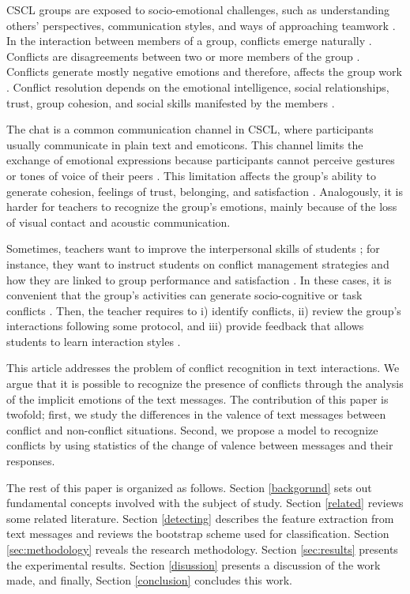 \documentclass[3p,times,preprint]{elsarticle}
\begin{document}
CSCL groups are exposed to socio-emotional challenges, such as understanding others' perspectives, communication styles, and ways of approaching
teamwork \citep{Jarvenoja2013}. In the interaction between members of a group, conflicts emerge naturally  \citep{Naykki2014}. Conflicts are disagreements between two or more members of the group \citep{Ayoko2008}. Conflicts generate mostly negative emotions and therefore, affects the group work \citep{Dreu2003,Jehn1997,Jiang2013,Lee2015}. %
Conflict resolution depends on the emotional intelligence, social relationships, trust, group cohesion, and social skills manifested by the members \citep{Jiang2013,Kreijns2003,Kwon2014,Lee2015,Rapisarda2002,Slof2016}.

The chat is a common communication channel in CSCL, where participants usually communicate in plain text and emoticons. This channel limits the exchange of emotional expressions because participants cannot perceive gestures or tones of voice of their peers \citep{Feidakis2014}. 
This limitation affects the group's ability to generate cohesion, feelings of trust, belonging, and satisfaction \citep{Nam2014}.  Analogously, it is harder for teachers to recognize the group's emotions, mainly because of the loss of visual contact and acoustic communication. 

Sometimes, teachers want to improve the interpersonal skills of students \citep{Rogat2015,Zheng2016}; for instance, they want to instruct students on conflict management strategies and how they are linked to group performance and satisfaction \citep{Lee2015,Slof2016}. In these cases, it is convenient that the group's activities can generate socio-cognitive or task conflicts \citep{Buchs2004}. Then, the teacher requires to i) identify conflicts,  ii) review the group's interactions following some protocol, and iii) provide feedback that allows students to learn interaction styles \citep{Buchs2004}.

This article addresses the problem of conflict recognition in text interactions. We argue that it is possible to recognize the presence of conflicts through the analysis of the implicit emotions of the text messages. The contribution of this paper is twofold; first, we study the differences in the valence of text messages between conflict and non-conflict situations. Second, we propose a model to recognize conflicts by using statistics of the change of valence between messages and their responses.

The rest of this paper is organized as follows. Section \ref{backgorund} sets out fundamental concepts involved with the subject of study. Section \ref{related} reviews some related literature. Section \ref{detecting} describes the feature extraction from text messages and reviews the bootstrap scheme used for classification. Section \ref{sec:methodology} reveals the research methodology. Section \ref{sec:results} presents the experimental results. Section \ref{disussion} presents a discussion of the work made, and finally, Section \ref{conclusion} concludes this work.
\end{document}
